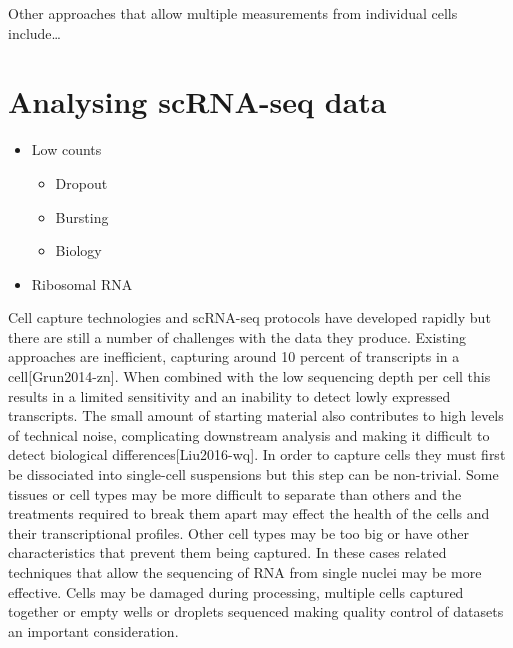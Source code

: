 \documentclass[11pt,a4paper,titlepage,twoside,openright]{style/unimelbthesis}
\theoremstyle{definition}
\theoremstyle{definition}
\theoremstyle{definition}
\theoremstyle{remark}
\begin{document}
\begin{mainmatter}
Other approaches that allow multiple measurements from individual cells include\ldots{}

\hypertarget{analysing-scrna-seq-data}{%
\section{Analysing scRNA-seq data}\label{analysing-scrna-seq-data}}

\begin{itemize}
\tightlist
\item
  Low counts

  \begin{itemize}
  \tightlist
  \item
    Dropout
  \item
    Bursting
  \item
    Biology
  \end{itemize}
\item
  Ribosomal RNA
\end{itemize}

Cell capture technologies and scRNA-seq protocols have developed rapidly but there are still a number of challenges with the data they produce. Existing approaches are inefficient, capturing around 10 percent of transcripts in a cell{[}Grun2014-zn{]}. When combined with the low sequencing depth per cell this results in a limited sensitivity and an inability to detect lowly expressed transcripts. The small amount of starting material also contributes to high levels of technical noise, complicating downstream analysis and making it difficult to detect biological differences{[}Liu2016-wq{]}. In order to capture cells they must first be dissociated into single-cell suspensions but this step can be non-trivial. Some tissues or cell types may be more difficult to separate than others and the treatments required to break them apart may effect the health of the cells and their transcriptional profiles. Other cell types may be too big or have other characteristics that prevent them being captured. In these cases related techniques that allow the sequencing of RNA from single nuclei may be more effective. Cells may be damaged during processing, multiple cells captured together or empty wells or droplets sequenced making quality control of datasets an important consideration.


\end{mainmatter}
\end{document}
